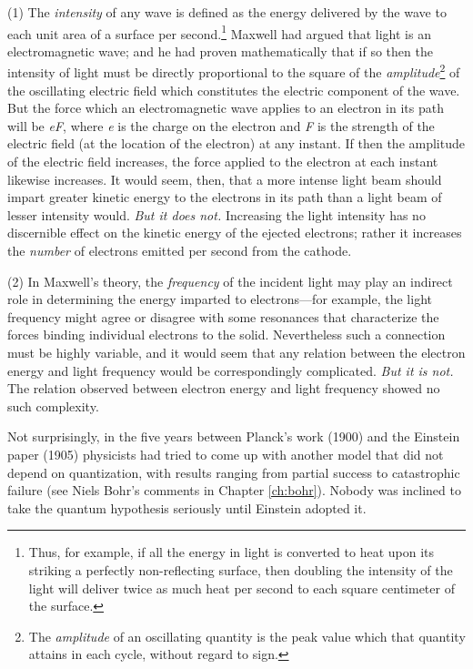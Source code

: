 (1) The \emph{intensity} of any wave is defined as the energy delivered
by the wave to each unit area of a surface per second.\footnote{Thus,
  for example, if all the energy in light is converted to heat upon its
  striking a perfectly non-reflecting surface, then doubling the
  intensity of the light will deliver twice as much heat per second to
  each square centimeter of the surface.} Maxwell had argued that light
is an electromagnetic wave; and he had proven mathematically that if so
then the intensity of light must be directly proportional to the square
of the \emph{amplitude}\footnote{The \emph{amplitude} of an oscillating
  quantity is the peak value which that quantity attains in each cycle,
  without regard to sign.} of the oscillating electric field which
constitutes the electric component of the wave. But the force which an
electromagnetic wave applies to an electron in its path will be
\emph{eF}, where \emph{e} is the charge on the electron and \emph{F} is
the strength of the electric field (at the location of the electron) at
any instant. If then the amplitude of the electric field increases, the
force applied to the electron at each instant likewise increases. It
would seem, then, that a more intense light beam should impart greater
kinetic energy to the electrons in its path than a light beam of lesser
intensity would. \emph{But it does not.} Increasing the light intensity
has no discernible effect on the kinetic energy of the ejected
electrons; rather it increases the \emph{number} of electrons emitted
per second from the cathode.

(2) In Maxwell's theory, the \emph{frequency} of the incident light may
play an indirect role in determining the energy imparted to
electrons---for example, the light frequency might agree or disagree
with some resonances that characterize the forces binding individual
electrons to the solid. Nevertheless such a connection must be highly
variable, and it would seem that any relation between the electron
energy and light frequency would be correspondingly complicated.
\emph{But it is not.} The relation observed between electron energy and
light frequency showed no such complexity.

Not surprisingly, in the five years between Planck's work (1900) and the
Einstein paper (1905) physicists had tried to come up with another model
that did not depend on quantization, with results ranging from partial
success to catastrophic failure (see Niels Bohr's comments in 
Chapter \ref{ch:bohr}).
Nobody was inclined to take the quantum hypothesis seriously until
Einstein adopted it.

